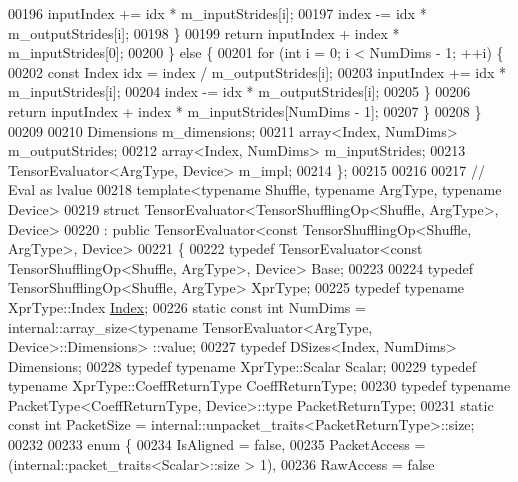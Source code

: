 \begin{DoxyCode}
00196         inputIndex += idx * m\_inputStrides[i];
00197         index -= idx * m\_outputStrides[i];
00198       \}
00199       \textcolor{keywordflow}{return} inputIndex + index * m\_inputStrides[0];
00200     \} \textcolor{keywordflow}{else} \{
00201       \textcolor{keywordflow}{for} (\textcolor{keywordtype}{int} i = 0; i < NumDims - 1; ++i) \{
00202         \textcolor{keyword}{const} Index idx = index / m\_outputStrides[i];
00203         inputIndex += idx * m\_inputStrides[i];
00204         index -= idx * m\_outputStrides[i];
00205       \}
00206       \textcolor{keywordflow}{return} inputIndex + index * m\_inputStrides[NumDims - 1];
00207     \}
00208   \}
00209 
00210   Dimensions m\_dimensions;
00211   array<Index, NumDims> m\_outputStrides;
00212   array<Index, NumDims> m\_inputStrides;
00213   TensorEvaluator<ArgType, Device> m\_impl;
00214 \};
00215 
00216 
00217 \textcolor{comment}{// Eval as lvalue}
00218 \textcolor{keyword}{template}<\textcolor{keyword}{typename} Shuffle, \textcolor{keyword}{typename} ArgType, \textcolor{keyword}{typename} Device>
00219 \textcolor{keyword}{struct }TensorEvaluator<TensorShufflingOp<Shuffle, ArgType>, Device>
00220     : \textcolor{keyword}{public} TensorEvaluator<const TensorShufflingOp<Shuffle, ArgType>, Device>
00221 \{
00222   \textcolor{keyword}{typedef} TensorEvaluator<const TensorShufflingOp<Shuffle, ArgType>, Device> Base;
00223 
00224   \textcolor{keyword}{typedef} TensorShufflingOp<Shuffle, ArgType> XprType;
00225   \textcolor{keyword}{typedef} \textcolor{keyword}{typename} XprType::Index \hyperlink{namespace_eigen_a62e77e0933482dafde8fe197d9a2cfde}{Index};
00226   \textcolor{keyword}{static} \textcolor{keyword}{const} \textcolor{keywordtype}{int} NumDims = internal::array\_size<typename TensorEvaluator<ArgType, Device>::Dimensions>
      ::value;
00227   \textcolor{keyword}{typedef} DSizes<Index, NumDims> Dimensions;
00228   \textcolor{keyword}{typedef} \textcolor{keyword}{typename} XprType::Scalar Scalar;
00229   \textcolor{keyword}{typedef} \textcolor{keyword}{typename} XprType::CoeffReturnType CoeffReturnType;
00230   \textcolor{keyword}{typedef} \textcolor{keyword}{typename} PacketType<CoeffReturnType, Device>::type PacketReturnType;
00231   \textcolor{keyword}{static} \textcolor{keyword}{const} \textcolor{keywordtype}{int} PacketSize = internal::unpacket\_traits<PacketReturnType>::size;
00232 
00233   \textcolor{keyword}{enum} \{
00234     IsAligned = \textcolor{keyword}{false},
00235     PacketAccess = (internal::packet\_traits<Scalar>::size > 1),
00236     RawAccess = \textcolor{keyword}{false}

\end{DoxyCode}
